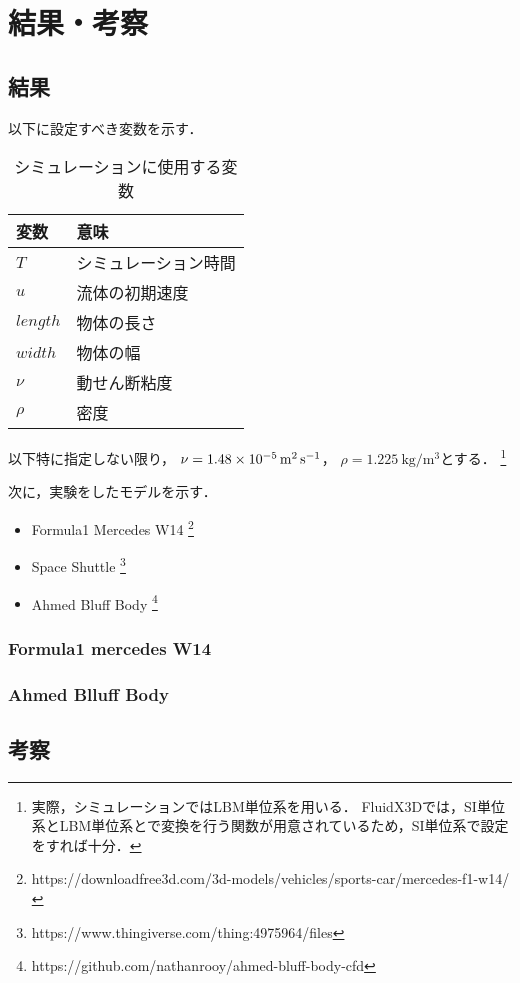 \documentclass[main]{subfiles}
\begin{document}
\chapter{結果・考察}

\section{結果}

以下に設定すべき変数を示す．
\begin{table}[ht]
    \centering
    \caption{シミュレーションに使用する変数}
    \begin{tabular}{ll}
        \toprule
        変数       & 意味         \\
        \midrule
        $T$      & シミュレーション時間 \\
        $u$      & 流体の初期速度    \\
        $length$ & 物体の長さ      \\
        $width$  & 物体の幅       \\
        $\nu$    & 動せん断粘度     \\
        $\rho$   & 密度         \\
        \bottomrule
    \end{tabular}%
    \label{tab:result-variables}%
\end{table}

以下特に指定しない限り，
$\nu=\SI{1.48E-5}{\square\meter\per\second}$，
$\rho=\SI{1.225}{\kilogram\per\cubic\meter}$とする．
\footnote{
    実際，シミュレーションではLBM単位系を用いる．
    FluidX3Dでは，SI単位系とLBM単位系とで変換を行う関数が用意されているため，SI単位系で設定をすれば十分．
}

次に，実験をしたモデルを示す．

\begin{itemize}
    \item Formula1 Mercedes W14 \footnote{https://downloadfree3d.com/3d-models/vehicles/sports-car/mercedes-f1-w14/}
    \item Space Shuttle \footnote{https://www.thingiverse.com/thing:4975964/files}
    \item Ahmed Bluff Body \footnote{https://github.com/nathanrooy/ahmed-bluff-body-cfd}
\end{itemize}

\clearpage
\subsection{Formula1 mercedes W14}


\subsection{Ahmed Blluff Body}


\clearpage

\section{考察}
\end{document}

